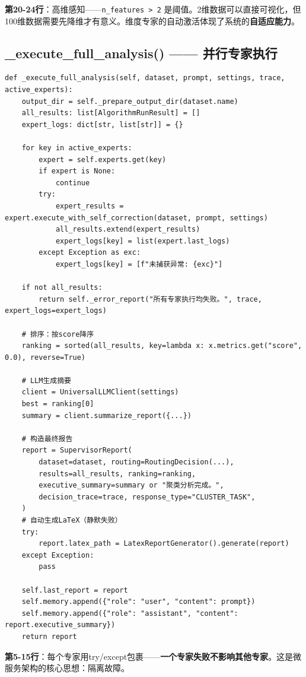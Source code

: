 \documentclass[11pt,a4paper]{ctexbook}
\begin{document}
\textbf{第20-24行}：高维感知——\verb|n_features > 2| 是阈值。2维数据可以直接可视化，但100维数据需要先降维才有意义。维度专家的自动激活体现了系统的\textbf{自适应能力}。

\subsection{\_execute\_full\_analysis() —— 并行专家执行}

\begin{verbatim}
def _execute_full_analysis(self, dataset, prompt, settings, trace, active_experts):
    output_dir = self._prepare_output_dir(dataset.name)
    all_results: list[AlgorithmRunResult] = []
    expert_logs: dict[str, list[str]] = {}

    for key in active_experts:
        expert = self.experts.get(key)
        if expert is None:
            continue
        try:
            expert_results = expert.execute_with_self_correction(dataset, prompt, settings)
            all_results.extend(expert_results)
            expert_logs[key] = list(expert.last_logs)
        except Exception as exc:
            expert_logs[key] = [f"未捕获异常: {exc}"]

    if not all_results:
        return self._error_report("所有专家执行均失败。", trace, expert_logs=expert_logs)

    # 排序：按score降序
    ranking = sorted(all_results, key=lambda x: x.metrics.get("score", 0.0), reverse=True)

    # LLM生成摘要
    client = UniversalLLMClient(settings)
    best = ranking[0]
    summary = client.summarize_report({...})

    # 构造最终报告
    report = SupervisorReport(
        dataset=dataset, routing=RoutingDecision(...),
        results=all_results, ranking=ranking,
        executive_summary=summary or "聚类分析完成。",
        decision_trace=trace, response_type="CLUSTER_TASK",
    )
    # 自动生成LaTeX（静默失败）
    try:
        report.latex_path = LatexReportGenerator().generate(report)
    except Exception:
        pass

    self.last_report = report
    self.memory.append({"role": "user", "content": prompt})
    self.memory.append({"role": "assistant", "content": report.executive_summary})
    return report
\end{verbatim}

\textbf{第5-15行}：每个专家用try/except包裹——\textbf{一个专家失败不影响其他专家}。这是微服务架构的核心思想：隔离故障。
\end{document}
